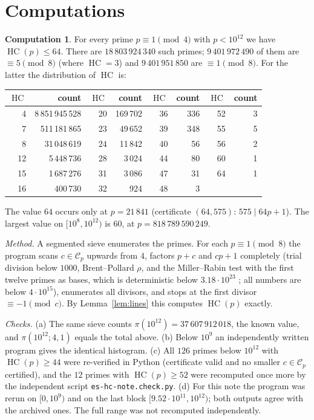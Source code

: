 \documentclass[11pt,reqno]{amsart}
\theoremstyle{definition}
\newtheorem{computation}[theorem]{Computation}
\newcommand{\cC}{\mathcal C}
\newcommand{\HC}{\operatorname{HC}}
\begin{document}
\section{Computations}\label{sec:census}

\begin{computation}\label{comp:census}
For every prime $p\equiv1\pmod4$ with $p<10^{12}$ we have $\HC(p)\le64$.
There are $18\,803\,924\,340$ such primes; $9\,401\,972\,490$ of them are
$\equiv5\pmod 8$ (where $\HC=3$) and $9\,401\,951\,850$ are $\equiv1\pmod8$.
For the latter the distribution of $\HC$ is:
\begin{center}
\small
\begin{tabular}{rrrrrrrr}
\toprule
$\HC$&count&$\HC$&count&$\HC$&count&$\HC$&count\\
\midrule
4&8\,851\,945\,528&20&169\,702&36&336&52&3\\
7&511\,181\,865&23&49\,652&39&348&55&5\\
8&31\,048\,619&24&11\,842&40&56&56&2\\
12&5\,448\,736&28&3\,024&44&80&60&1\\
15&1\,687\,276&31&3\,086&47&31&64&1\\
16&400\,730&32&924&48&3&&\\
\bottomrule
\end{tabular}
\end{center}
The value $64$ occurs only at $p=21\,841$ (certificate $(64,575)$:
$575\mid64p+1$).  The largest value on $[10^8,10^{12})$ is $60$, at
$p=818\,789\,590\,249$.
\end{computation}

\emph{Method.}  A segmented sieve enumerates the primes.  For each
$p\equiv1\pmod8$ the program scans $c\in\cC_p$ upwards from $4$, factors
$p+c$ and $cp+1$ completely (trial division below $1000$, Brent--Pollard
$\rho$, and the Miller--Rabin test with the first twelve primes as bases,
which is deterministic below $3.18\cdot10^{23}$ \cite{SW}; all numbers are
below $4\cdot10^{15}$), enumerates all divisors, and stops at the first
divisor $\equiv-1\pmod c$.  By Lemma~\ref{lem:lines} this computes
$\HC(p)$ exactly.

\emph{Checks.}  (a) The same sieve counts $\pi(10^{12})=37\,607\,912\,018$,
the known value, and $\pi(10^{12};4,1)$ equals the total above.  (b)
Below $10^9$ an independently written program gives the identical
histogram.  (c) All $126$ primes below $10^{12}$ with $\HC(p)\ge44$ were
re-verified in Python (certificate valid and no smaller $c\in\cC_p$
certified), and the $12$ primes with $\HC(p)\ge52$ were recomputed once
more by the independent script \texttt{es-hc-note.check.py}.  (d) For this
note the program was rerun on $[0,10^9)$ and on the last block
$[9.52\cdot10^{11},10^{12})$; both outputs agree with the archived ones.
The full range was not recomputed independently.
\end{document}

